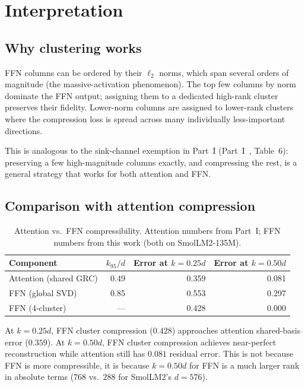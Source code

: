\documentclass[11pt]{article}
\begin{document}
\section{Interpretation}
\label{sec:interpretation}

\subsection{Why clustering works}

FFN columns can be ordered by their $\ell_2$ norms, which span several
orders of magnitude (the massive-activation phenomenon).  The top few
columns by norm dominate the FFN output; assigning them to a dedicated
high-rank cluster preserves their fidelity.  Lower-norm columns are
assigned to lower-rank clusters where the compression loss is spread
across many individually less-important directions.

This is analogous to the sink-channel exemption in Part~I
(Part~I~\cite{stewart2026grc}, Table~6): preserving a few high-magnitude columns
exactly, and compressing the rest, is a general strategy that works
for both attention and FFN.

\subsection{Comparison with attention compression}

\begin{table}[h]\centering\small
\caption{Attention vs.\ FFN compressibility.  Attention numbers from
Part~I; FFN numbers from this work (both on SmolLM2-135M).}
\label{tab:attn-vs-ffn}
\begin{tabular}{@{}lrrr@{}}
\toprule
Component & $k_{95}/d$ & Error at $k{=}0.25d$ & Error at $k{=}0.50d$ \\
\midrule
Attention (shared GRC)  & 0.49 & 0.359 & 0.081 \\
FFN (global SVD)        & 0.85 & 0.553 & 0.297 \\
FFN (4-cluster)         & ---  & 0.428 & 0.000 \\
\bottomrule
\end{tabular}
\end{table}

At $k{=}0.25d$, FFN cluster compression ($0.428$) approaches attention
shared-basis error ($0.359$).  At $k{=}0.50d$, FFN cluster compression
achieves near-perfect reconstruction while attention still has $0.081$
residual error.  This is not because FFN is more compressible, it is
because $k{=}0.50d$ for FFN is a much larger rank in absolute terms
($768$ vs.\ $288$ for SmolLM2's $d{=}576$).
\end{document}

